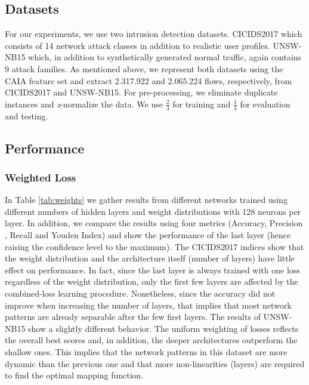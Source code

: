 \documentclass[conference]{IEEEtran}
\begin{document}
\subsection{Datasets}
For our experiments, we use two intrusion detection datasets. CICIDS2017 \cite{sharafaldin_toward_2018} which consists of 14 network attack classes in addition to realistic user profiles. UNSW-NB15 \cite{moustafa_unsw-nb15_2015} which, in addition to synthetically generated normal traffic, again contains 9 attack families. As mentioned above, we represent both datasets using the CAIA feature set and extract 2.317.922 and 2.065.224 flows, respectively, from CICIDS2017 and UNSW-NB15. For pre-processing, we eliminate duplicate instances and \emph{z}-normalize the data. We use $\frac{2}{3}$ for training and $\frac{1}{3}$ for evaluation and testing.

\subsection{Performance}

\subsubsection{Weighted Loss}
In Table \ref{tab:weights} we gather results from different networks trained using different numbers of hidden layers and weight distributions with 128 neurons per layer. In addition, we compare the results using four metrics (Accuracy, Precision , Recall and Youden Index) and show the performance of the last layer (hence raising the confidence level to the maximum). The CICIDS2017 indices show that the weight distribution and the architecture itself (number of layers) have little effect on performance. In fact, since the last layer is always trained with one loss regardless of the weight distribution, only the first few layers are affected by the combined-loss learning procedure. Nonetheless, since the accuracy did not improve when increasing the number of layers, that implies that most network patterns are already separable after the few first layers. The results of UNSW-NB15 show a slightly different behavior. The uniform weighting of losses reflects the overall best scores and, in addition, the deeper architectures outperform the shallow ones. This implies that the network patterns in this dataset are more dynamic than the previous one and that more non-linearities (layers) are required to find the optimal mapping function.
\end{document}
